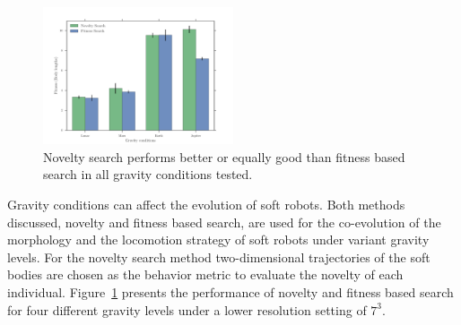 \documentclass{sig-alternate}
\begin{document}
\begin{figure}[b!]
\centering
\includegraphics[width=0.5\textwidth]{../Figures/Results/GravityExperiment.pdf}
\caption{Novelty search performs better or equally good than fitness based search in all gravity conditions tested.}
\label{fig:gravityConditions}
\vspace{-15pt}
\end{figure}


Gravity conditions can affect the evolution of soft robots. Both methods discussed, novelty and fitness based search, are used for the co-evolution of the morphology and the locomotion strategy of soft robots under variant gravity levels. For the novelty search method two-dimensional trajectories of the soft bodies are chosen as the behavior metric to evaluate the novelty of each individual. Figure~\ref{fig:gravityConditions} presents the performance of novelty and fitness based search for four different gravity levels under a lower resolution setting of $7^3$.
\end{document}
